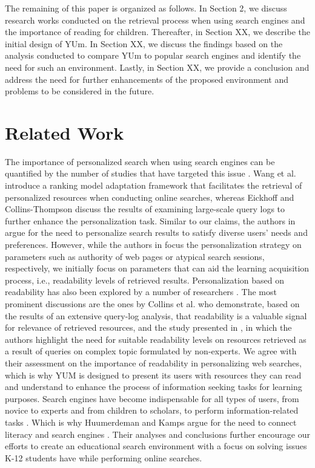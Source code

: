 \documentclass{sig-alternate-05-2015}
\begin{document}
The remaining of this paper is organized as follows. In Section 2, we discuss research works conducted on the retrieval process when using search engines and the importance of reading for children. Thereafter, in Section XX, we describe the initial design of YUm. In Section XX, we discuss the findings based on the analysis conducted to compare YUm to popular search engines and identify the need for such an environment. Lastly, in Section XX, we provide a conclusion and address the need for further enhancements of the proposed environment and problems to be considered in the future. 

\section{Related Work}
The importance of personalized search when using search engines can be quantified by the number of studies that have targeted this issue \cite{Col11, Jat12, Eic13, Wan13}. Wang et al. \cite{Wan13} introduce a ranking model adaptation framework that facilitates the retrieval of personalized resources when conducting online searches, whereas Eickhoff and Collins-Thompson \cite{Eic13} discuss the results of examining large-scale query logs to further enhance the personalization task. Similar to our claims, the authors in \cite{Wan13, Eic13} argue for the need to personalize search results to satisfy diverse users' needs and preferences. However, while the authors in \cite{Wan13, Eic13} focus the personalization strategy on parameters such as authority of web pages or atypical search sessions, respectively, we initially focus on parameters that can aid the learning acquisition process, i.e., readability levels of retrieved results. Personalization based on readability has also been explored by a number of researchers \cite{Coll11, Jat12}. The most prominent discussions are the ones by Collins et al. \cite{Col11} who demonstrate, based on the results of an extensive query-log analysis, that readability is a valuable signal for relevance of retrieved resources, and the study presented in \cite{Jat12}, in which the authors highlight the need for suitable readability levels on resources retrieved as a result of queries on complex topic formulated by non-experts. We agree with their assessment on the importance of readability in personalizing web searches, which is why YUM is designed to present its users with resources they can read and understand to enhance the process of information seeking tasks for learning purposes.
Search engines have become indispensable for all types of users, from novice to experts and from children to scholars, to perform information-related tasks \cite{Huu15}. Which is why Huumerdeman and Kamps argue for the need to connect literacy and search engines \cite{Huu15}. Their analyses and conclusions further encourage our efforts to create an educational search environment with a focus on solving issues K-12 students have while performing online searches.
\end{document}
